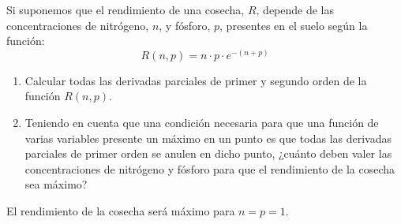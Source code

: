 {Si suponemos que el rendimiento de una cosecha, $R$, depende de las concentraciones de nitrógeno, $n$, y fósforo, $p$, presentes en el suelo según la función:
\[
R(n,p) = n \cdot p \cdot e^{ - (n + p)}
\]
\begin{enumerate}
\item Calcular todas las derivadas parciales de primer y segundo orden de la función $R(n,p)$.
\item Teniendo en cuenta que una condición necesaria para que una función de varias variables presente un máximo en un
punto es que todas las derivadas parciales de primer orden se anulen en dicho punto, ¿cuánto deben valer las
concentraciones de nitrógeno y fósforo para que el rendimiento de la cosecha sea máximo?
\end{enumerate}
}
{El rendimiento de la cosecha será máximo para $n=p=1$. 
}
{
}


